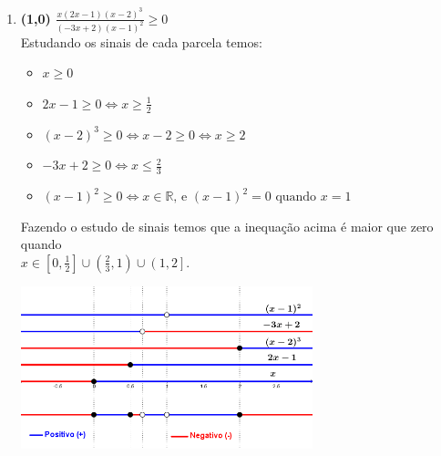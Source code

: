 \documentclass[a4paper,12pt]{article}
\newcommand{\RR}{\mathbb{R}}
\newcommand{\ds}{\displaystyle}
\begin{document}
\begin{enumerate}
\begin{enumerate}
 \item {\bf (1,0)} $\ds \frac{x(2x-1)(x-2)^3}{(-3x+2)(x-1)^2}\geq 0  $\\
 \vspace{3mm}
 Estudando os sinais de cada parcela temos:
  \begin{itemize}
   \item $x\geq0$\\
   \item $2x-1 \geq 0 \Leftrightarrow x\geq\frac{1}{2}$\\
   \item $(x-2)^3 \geq 0 \Leftrightarrow x-2\geq0 \Leftrightarrow x\geq2$\\
   \item $-3x+2 \geq 0 \Leftrightarrow x\leq\frac{2}{3}$\\
   \item $(x-1)^2 \geq 0 \Leftrightarrow x\in \RR \mbox{, e } (x-1)^2 = 0 \mbox{ quando } x = 1$\\
  \end{itemize}
 Fazendo o estudo de sinais temos que a inequação acima é maior que zero quando\\ $x\in\left[0,\frac{1}{2}\right]\cup\left(\frac{2}{3},1\right)\cup\left(1, 2\right]$.\\
 \begin{center}
 \includegraphics[width = 320px]{Q1b.png}
 \end{center}



\end{enumerate}
\end{enumerate}
\end{document}
